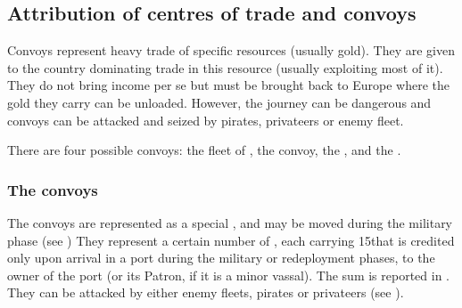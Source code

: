 \subsection{Attribution of centres of trade and convoys}

\aparag Convoys represent heavy trade of specific resources (usually
gold). They are given to the country dominating trade in this resource
(usually exploiting most of it). They do not bring income per se but must be
brought back to Europe where the gold they carry can be unloaded. However, the
journey can be dangerous and convoys can be attacked and seized by pirates,
privateers or enemy fleet.

\aparag There are four possible convoys: the  fleet of
, the  convoy, the , and
the .


\subsubsection{The convoys}\label{chIncomes:Convoys}
\aparag The convoys are represented as a special \ND, and may be moved during
the military phase (see )
\bparag They represent a certain number of \NTD, each carrying 15\ducats that
is credited only upon arrival in a port during the military or redeployment
phases, to the owner of the port (or its Patron, if it is a minor vassal).
\bparag The sum is reported in .
\bparag They can be attacked by either enemy fleets, pirates or privateers
(see ).

